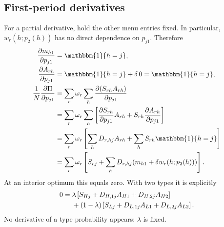 \documentclass[12pt]{article}
\theoremstyle{definition}
\theoremstyle{remark}
\newcommand{\ind}{\mathbbm{1}}
\numberwithin{equation}{section}
\begin{document}
\subsection{First-period derivatives}
For a partial derivative, hold the other menu entries fixed. In particular,
$w_r(h;p_2(h))$ has no direct dependence on $p_{j1}$. Therefore
\begin{align}
 \frac{\partial m_{h1}}{\partial p_{j1}}&=\ind\{h=j\},\\
 \frac{\partial A_{rh}}{\partial p_{j1}}
 &=\ind\{h=j\}+\delta\,0=\ind\{h=j\},\\
 \frac1N\frac{\partial\Pi}{\partial p_{j1}}
 &=\sum_r\omega_r\sum_h
       \frac{\partial(S_{rh}A_{rh})}{\partial p_{j1}}\\
 &=\sum_r\omega_r\sum_h
       \left[\frac{\partial S_{rh}}{\partial p_{j1}}A_{rh}
                   +S_{rh}\frac{\partial A_{rh}}{\partial p_{j1}}\right]\\
 &=\sum_r\omega_r\left[\sum_hD_{r,hj}A_{rh}
                          +\sum_hS_{rh}\ind\{h=j\}\right]\\
 &=\sum_r\omega_r\left[S_{rj}+\sum_hD_{r,hj}
                         (m_{h1}+\delta w_r(h;p_2(h)))\right].
\end{align}
At an interior optimum this equals zero. With two types it is explicitly
\begin{align}
 0={}&\lambda\left[S_{Hj}+D_{H,1j}A_{H1}+D_{H,2j}A_{H2}\right]\notag\\
 &+(1-\lambda)\left[S_{Lj}+D_{L,1j}A_{L1}+D_{L,2j}A_{L2}\right].
\end{align}
No derivative of a type probability appears: $\lambda$ is fixed.
\end{document}
